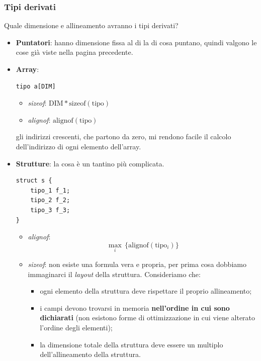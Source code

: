 \documentclass[11pt]{report}
\theoremstyle{definition}
\begin{document}
\subsubsection{Tipi derivati}
Quale dimensione e allineamento avranno i tipi derivati?
\begin{itemize}
\item \textbf{Puntatori}: hanno dimensione fissa al di la di cosa puntano, quindi valgono le cose già viste nella pagina precedente.
\item  \textbf{Array}: \begin{verbatim}
tipo a[DIM]
\end{verbatim}
\begin{multicols}{2}
\begin{itemize}
\item \emph{sizeof}: $\text{DIM} * \text{sizeof}(\text{tipo})$
\item \emph{alignof}: $\text{alignof}(\text{tipo})$
\end{itemize}
\end{multicols}
gli indirizzi crescenti, che partono da zero, mi rendono facile il calcolo dell'indirizzo di ogni elemento dell'array.

\item \textbf{Strutture}: la cosa è un tantino più complicata.

\begin{verbatim}
struct s {
    tipo_1 f_1;
    tipo_2 f_2;
    tipo_3 f_3;
}
\end{verbatim}\begin{itemize}
\item \emph{alignof}: \[\max_i\, \{ \text{alignof}(\text{tipo$_i$})\}\]
\item \emph{sizeof}: non esiste una formula vera e propria, per prima cosa dobbiamo immaginarci il \emph{layout} della struttura. Consideriamo che:
\begin{itemize}
\item ogni elemento della struttura deve rispettare il proprio allineamento; 
\item i campi devono trovarsi in memoria \textbf{nell'ordine in cui sono dichiarati} (non esistono forme di ottimizzazione in cui viene alterato l'ordine degli elementi);
\item la dimensione totale della struttura deve essere un multiplo dell'allineamento della struttura.
\end{itemize}
\end{itemize}
\end{itemize}
\end{document}
